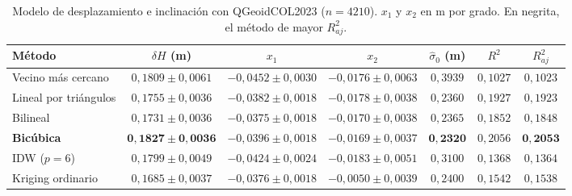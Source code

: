 \documentclass[11pt,letterpaper]{article}
\begin{document}
\begin{table}[H]
\centering
\caption{Modelo de desplazamiento e inclinación con QGeoidCOL2023 ($n=4210$). $x_1$ y $x_2$
en m por grado. En negrita, el método de mayor $R^2_{aj}$.}
\label{tab:param_qgeoid}
\small
\begin{adjustbox}{max width=\linewidth}
\begin{tabular}{@{}lcccccc@{}}
\toprule
Método & $\delta H$ (m) & $x_1$ & $x_2$ & $\hat\sigma_0$ (m) & $R^2$ & $R^2_{aj}$ \\
\midrule
Vecino más cercano    & $0{,}1809\pm0{,}0061$ & $-0{,}0452\pm0{,}0030$ & $-0{,}0176\pm0{,}0063$ & $0{,}3939$ & $0{,}1027$ & $0{,}1023$ \\
Lineal por triángulos & $0{,}1755\pm0{,}0036$ & $-0{,}0382\pm0{,}0018$ & $-0{,}0178\pm0{,}0038$ & $0{,}2360$ & $0{,}1927$ & $0{,}1923$ \\
Bilineal              & $0{,}1731\pm0{,}0036$ & $-0{,}0375\pm0{,}0018$ & $-0{,}0170\pm0{,}0038$ & $0{,}2365$ & $0{,}1852$ & $0{,}1848$ \\
\textbf{Bicúbica}     & $\mathbf{0{,}1827\pm0{,}0036}$ & $-0{,}0396\pm0{,}0018$ & $-0{,}0169\pm0{,}0037$ & $\mathbf{0{,}2320}$ & $0{,}2056$ & $\mathbf{0{,}2053}$ \\
IDW ($p=6$)           & $0{,}1799\pm0{,}0049$ & $-0{,}0424\pm0{,}0024$ & $-0{,}0183\pm0{,}0051$ & $0{,}3100$ & $0{,}1368$ & $0{,}1364$ \\
Kriging ordinario     & $0{,}1685\pm0{,}0037$ & $-0{,}0376\pm0{,}0018$ & $-0{,}0050\pm0{,}0039$ & $0{,}2400$ & $0{,}1542$ & $0{,}1538$ \\
\bottomrule
\end{tabular}
\end{adjustbox}
\end{table}
\end{document}
